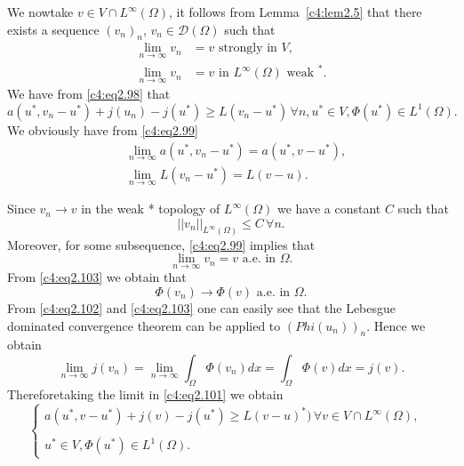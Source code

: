 We now\pageoriginale  take $v \in V \cap L^\infty (\Omega)$, it follows from 
Lemma~\ref{c4:lem2.5} that there exists a sequence $(v_n)_n$, $v_n \in \mathscr{D}(\Omega)$ such that 
\begin{align}
\lim_{n \to \infty} v_n & = v \text{ strongly in }V, \tag{2.99}\label{c4:eq2.99}\\
\lim_{n \to \infty} v_n & = v \text{ in }L^\infty (\Omega) \text{ weak }^*. \tag{2.100}\label{c4:eq2.100}
\end{align}
We have from \eqref{c4:eq2.98} that 
\begin{equation}
a(u^*, v_n-u^*) + j(u_n) - j(u^*) \geq L(v_n - u^*)\, \forall n, u^* \in V, 
\Phi (u^*) \in L^1(\Omega). \tag{2.101}\label{c4:eq2.101}
\end{equation}
We obviously have from \eqref{c4:eq2.99}
\begin{align*}
& \lim_{n \to \infty} a(u^*, v_n - u^*) = a(u^*, v-u^*),\\
& \lim_{n \to \infty} L(v_n - u^*) = L(v-u).
\end{align*}

Since $v_n \to v$ in the weak * topology of $L^\infty(\Omega)$ we have a constant $C$ such that 
\begin{equation}
||v_n||_{L^{\infty}(\Omega)} \leq C\, \forall n. \tag{2.102}\label{c4:eq2.102}
\end{equation}
Moreover, for some subsequence, \eqref{c4:eq2.99} implies that 
\begin{equation}
\lim_{n \to \infty} v_n = v \text{ a.e. in } \Omega. \tag{2.103}\label{c4:eq2.103}
\end{equation}
From \eqref{c4:eq2.103} we obtain that 
$$
\Phi (v_n) \to \Phi (v) \text{ a.e. in } \Omega.
$$
From \eqref{c4:eq2.102} and \eqref{c4:eq2.103} one can easily see that the Lebesgue 
dominated convergence theorem can be applied to $(Phi(u_n))_n$. Hence we obtain 
$$
\lim_{n \to \infty} j (v_n) = \lim_{n \to \infty} \int_\Omega 
\Phi (v_n) dx = \int_\Omega \Phi (v)dx = j(v).
$$
Therefore\pageoriginale  taking the limit in \eqref{c4:eq2.101} we obtain
\begin{equation}
\begin{cases}
a(u^*, v - u^*) + j(v) - j(u^*) \geq L(v - u)^*)\, \forall v \in V \cap L^\infty (\Omega),\\
&\\
u^* \in V, \Phi(u^*) \in L^1(\Omega).
\end{cases} \tag{2.104}\label{c4:eq2.104}
\end{equation}

